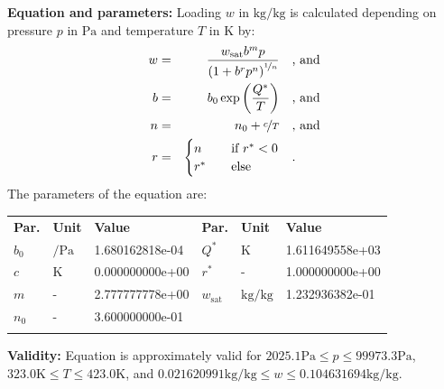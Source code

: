 \textbf{Equation and parameters:}
\newline
%
Loading $w$ in $\si{\kilogram\per\kilogram}$ is calculated depending on pressure $p$ in $\si{\pascal}$ and temperature $T$ in $\si{\kelvin}$ by:
%
\begin{equation*}
\begin{split}
w &=& \frac{w_\mathrm{sat} b^{m} p}{\left( 1 + b^{r} p^{n} \right)^{\nicefrac{1}{n}}} & \quad\text{, and} \\
b &=& b_0 \exp\left( \frac{Q^{*}}{T} \right) & \quad\text{, and} \\
n &=& n_0 + \nicefrac{c}{T} & \quad\text{, and} \\
r &=& \begin{cases} n & \quad \text{if } r^{*} < 0 \\ r^{*}  & \quad \text{else} \end{cases} & \quad\text{.}
\end{split}
\end{equation*}
%
The parameters of the equation are:
%
\begin{longtable}[l]{lll|lll}
\toprule
\addlinespace
\textbf{Par.} & \textbf{Unit} & \textbf{Value} &	\textbf{Par.} & \textbf{Unit} & \textbf{Value} \\
\addlinespace
\midrule
\endhead

\bottomrule
\endfoot
\bottomrule
\endlastfoot
\addlinespace

$b_0$ & $\si{\per\pascal}$ & 1.680162818e-04 & $Q^{*}$ & $\si{\kelvin}$ & 1.611649558e+03 \\
$c$ & $\si{\kelvin}$ & 0.000000000e+00 & $r^{*}$ & - & 1.000000000e+00 \\
$m$ & - & 2.777777778e+00 & $w_\mathrm{sat}$ & $\si{\kilogram\per\kilogram}$ & 1.232936382e-01 \\
$n_0$ & - & 3.600000000e-01 & & & \\

\addlinespace\end{longtable}

\textbf{Validity:}
\newline
Equation is approximately valid for $2025.1 \si{\pascal} \leq p \leq 99973.3 \si{\pascal}$,  $323.0 \si{\kelvin} \leq T \leq 423.0 \si{\kelvin}$, and $0.021620991 \si{\kilogram\per\kilogram} \leq w \leq 0.104631694 \si{\kilogram\per\kilogram}$.
\newline

